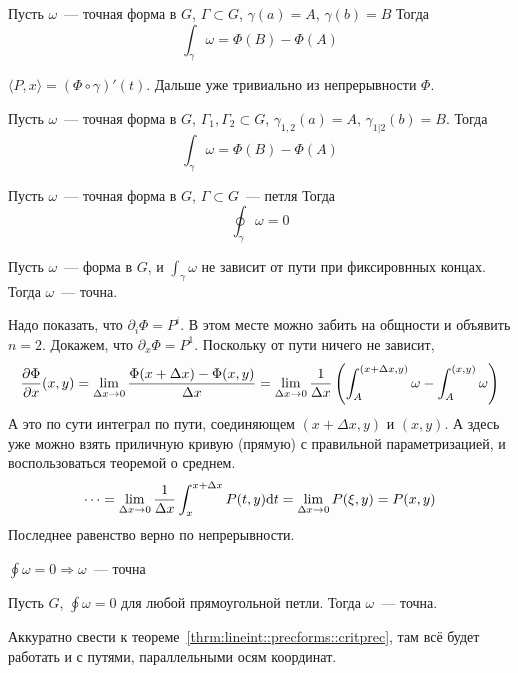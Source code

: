\documentclass[12pt,timbord]{../../../notes}
\begin{document}
\begin{thrm}\label{thrm:lineint::precforms::precint}
  Пусть $\omega$~--- точная форма в  $G$, $\Gamma \subset G$, $\gamma(a)=A$, $\gamma(b)=B$
  Тогда
  \[
    \int_\gamma \omega = \Phi(B) - \Phi(A)
  \]
\end{thrm}
\begin{ittproof}
  $\langle P, x \rangle = (\Phi \circ \gamma)' (t)$. Дальше уже тривиально из непрерывности
  $\Phi$.
\end{ittproof}

\begin{thrm}\label{thrm:lineint::precforms::precint2}
  Пусть $\omega$~--- точная форма в  $G$, $\Gamma_1, \Gamma_2 \subset G$,
  $\gamma_{1,2}(a)=A$, $\gamma_{1|2}(b)=B$.
  Тогда
  \[
    \int_\gamma \omega = \Phi(B) - \Phi(A)
  \]
\end{thrm}

\begin{thrm}\label{thrm:lineint::precforms::loopint}
  Пусть $\omega$~--- точная форма в  $G$, $\Gamma \subset G$~--- петля
  Тогда
  \[
    \oint_\gamma \omega = 0
  \]
\end{thrm}

\begin{thrm}\label{thrm:lineint::precforms::critprec}
  Пусть $\omega$~--- форма в  $G$, и $\int_\gamma \omega $ не зависит от пути при фиксировнных
  концах. Тогда $\omega$~--- точна.
\end{thrm}

\begin{ittproof}
  Надо показать, что $\partial_i \Phi = P^i$. В этом месте можно забить на общности и объявить
  $n=2$. Докажем, что $\partial_x \Phi = P^1$. Поскольку от пути ничего не зависит,
  \[
    \frac{\partial \Phi}{\partial x}(x,y) = \lim_{\Delta x\to 0}\frac{\Phi(x+\Delta x)- \Phi(x,y)}{\Delta x} = 
    \lim_{\Delta x\to 0} \frac{1}{\Delta x} \left(\int_A^{{(x+\Delta x,y)}} \omega - 
    \int_A^{(x,y)} \omega\right)
  \]
  А это по сути интеграл по пути, соединяющем $(x+\Delta x, y)$ и $(x, y)$. А здесь уже можно
  взять приличную кривую (прямую) с правильной параметризацией, и воспользоваться теоремой о
  среднем.
  \[
    \cdots = \lim_{\Delta x \to 0} \frac{1}{\Delta x} \int_{x}^{x+\Delta x} P(t, y) \mathrm{d} t = 
    \lim_{\Delta x \to 0} P(\xi, y) = P(x,y)
  \]
  Последнее равенство верно по непрерывности.
\end{ittproof}

\begin{thrm}\label{thrm:lineint::precforms::critprecloop}
  $\displaystyle \oint \omega =0 \Rightarrow \omega$~--- точна
\end{thrm}

\begin{thrm}\label{thrm:lineint::precforms::precrecloop}
  Пусть $G$, $\oint \omega =0 $ для любой прямоугольной петли. Тогда $\omega$~--- точна.
\end{thrm}
\begin{ittproof}
  Аккуратно свести к теореме~\ref{thrm:lineint::precforms::critprec}, там всё будет работать и с
  путями, параллельными осям координат.
\end{ittproof}
\end{document}
